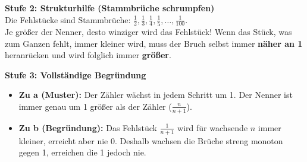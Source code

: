 \documentclass[a4paper,10pt]{article}
\newcommand{\mFrac}[2]{\frac{#1}{#2}}
\begin{document}
\begin{tcolorbox}[
    enhanced, colback=white, colframe=primaryBlue, arc=3mm, boxrule=1.2pt,
    left=4.5mm, right=4.5mm, top=2.5mm, bottom=2.5mm, height=12.9cm
]
    \begin{tcolorbox}[colback=step2Bg, colframe=step2Border, arc=2mm, boxrule=0.7pt, left=3mm, right=3mm, top=1.8mm, bottom=1.8mm]
        {\color{step2Text}\bfseries\faSearch\enskip Stufe 2: Strukturhilfe (Stammbrüche schrumpfen)}\\[0.8mm]
        {\small
        Die Fehlstücke sind Stammbrüche: $\mFrac{1}{2}, \mFrac{1}{3}, \mFrac{1}{4}, \mFrac{1}{5}, \dots, \mFrac{1}{100}$.\\
        Je größer der Nenner, desto winziger wird das Fehlstück! Wenn das Stück, was zum Ganzen fehlt, immer kleiner wird, muss der Bruch selbst immer \textbf{näher an 1} heranrücken und wird folglich immer \textbf{größer}.
        }
    \end{tcolorbox}
    \vspace{0.8mm}

    \begin{tcolorbox}[colback=step3Bg, colframe=step3Border, arc=2mm, boxrule=0.7pt, left=3mm, right=3mm, top=1.8mm, bottom=1.8mm]
        {\color{step3Text}\bfseries\faCheckCircle\enskip Stufe 3: Vollständige Begründung}\\[0.8mm]
        {\small
        \begin{itemize}[leftmargin=4mm, itemsep=0.2pt, topsep=1pt]
            \item \textbf{Zu a (Muster):} Der Zähler wächst in jedem Schritt um 1. Der Nenner ist immer genau um 1 größer als der Zähler ($\mFrac{n}{n+1}$).
            \item \textbf{Zu b (Begründung):} Das Fehlstück $\mFrac{1}{n+1}$ wird für wachsende $n$ immer kleiner, erreicht aber nie 0. Deshalb wachsen die Brüche streng monoton gegen 1, erreichen die 1 jedoch nie.
        \end{itemize}
        }
    \end{tcolorbox}
\end{tcolorbox}
\end{document}
